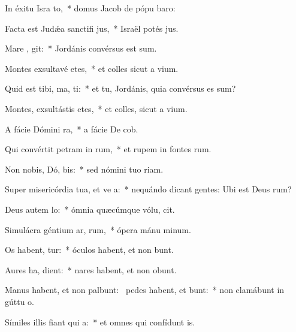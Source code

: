 \item In éxitu Isra  to,~* domus Jacob de pópu baro:
\item Facta est Judǽa sanctifi jus,~* Israël potés jus.
\item Mare ,  git:~* Jordánis convérsus est sum.
\item Montes exsultavé  etes,~* et colles sicut a vium.
\item Quid est tibi, ma,  ti:~* et tu, Jordánis, quia convérsus es sum?
\item Montes, exsultástis  etes,~* et colles, sicut a vium.
\item A fácie Dómini   ra,~* a fácie De cob.
\item Qui convértit petram in  rum,~* et rupem in fontes rum.
\item Non nobis, Dó,  bis:~* sed nómini tuo  riam.
\item Super misericórdia tua, et ve a:~* nequándo dicant gentes: Ubi est Deus rum?
\item Deus autem   lo:~* ómnia quæcúmque vólu, cit.
\item Simulácra géntium ar,  rum,~* ópera mánu minum.
\item Os habent,   tur:~* óculos habent, et non bunt.
\item Aures ha,   dient:~* nares habent, et non obunt.
\item Manus habent, et non palbunt:~\pscross{} pedes habent, et  bunt:~* non clamábunt in gúttu o.
\item Símiles illis fiant qui  a:~* et omnes qui confídunt  is.
